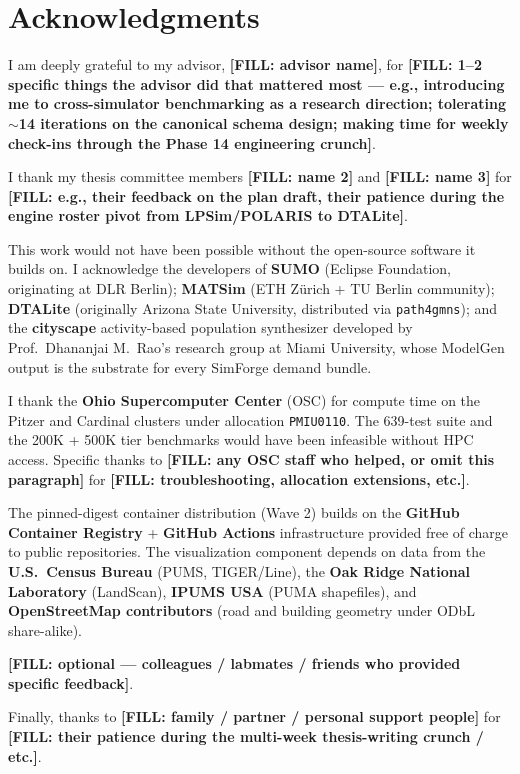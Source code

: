 
\clearpage
\thispagestyle{plain}
\section*{Acknowledgments}
{}

I am deeply grateful to my advisor, \textbf{[FILL: advisor name]}, for \textbf{[FILL: 1--2 specific things the advisor did that mattered most --- e.g., introducing me to cross-simulator benchmarking as a research direction; tolerating $\sim$14 iterations on the canonical schema design; making time for weekly check-ins through the Phase 14 engineering crunch]}.

I thank my thesis committee members \textbf{[FILL: name 2]} and \textbf{[FILL: name 3]} for \textbf{[FILL: e.g., their feedback on the plan draft, their patience during the engine roster pivot from LPSim/POLARIS to DTALite]}.

This work would not have been possible without the open-source software it builds on. I acknowledge the developers of \textbf{SUMO} (Eclipse Foundation, originating at DLR Berlin); \textbf{MATSim} (ETH Z\"urich + TU Berlin community); \textbf{DTALite} (originally Arizona State University, distributed via \texttt{path4gmns}); and the \textbf{cityscape} activity-based population synthesizer developed by Prof.\ Dhananjai M.\ Rao's research group at Miami University, whose ModelGen output is the substrate for every SimForge demand bundle.

I thank the \textbf{Ohio Supercomputer Center} (OSC) for compute time on the Pitzer and Cardinal clusters under allocation \texttt{PMIU0110}. The 639-test suite and the 200K + 500K tier benchmarks would have been infeasible without HPC access. Specific thanks to \textbf{[FILL: any OSC staff who helped, or omit this paragraph]} for \textbf{[FILL: troubleshooting, allocation extensions, etc.]}.

The pinned-digest container distribution (Wave 2) builds on the \textbf{GitHub Container Registry} + \textbf{GitHub Actions} infrastructure provided free of charge to public repositories. The visualization component depends on data from the \textbf{U.S.\ Census Bureau} (PUMS, TIGER/Line), the \textbf{Oak Ridge National Laboratory} (LandScan), \textbf{IPUMS USA} (PUMA shapefiles), and \textbf{OpenStreetMap contributors} (road and building geometry under ODbL share-alike).

\textbf{[FILL: optional --- colleagues / labmates / friends who provided specific feedback]}.

Finally, thanks to \textbf{[FILL: family / partner / personal support people]} for \textbf{[FILL: their patience during the multi-week thesis-writing crunch / etc.]}.

\clearpage
